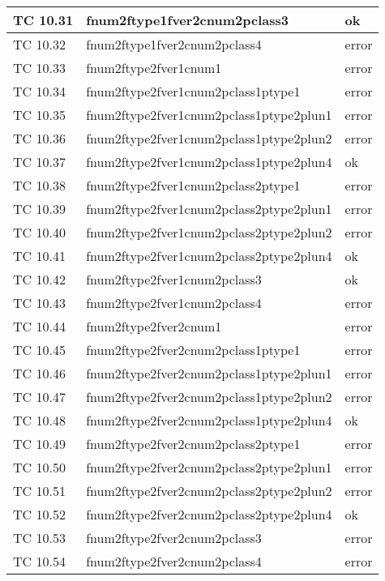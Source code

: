 \begin{longtable}{|p{3cm}|p{7cm}|p{3cm}|}
	\hline
	TC 10.31			& fnum2ftype1fver2cnum2pclass3			& ok \tabularnewline
	\hline
	TC 10.32			& fnum2ftype1fver2cnum2pclass4			& error \tabularnewline
	\hline
	TC 10.33			& fnum2ftype2fver1cnum1				& error \tabularnewline
	\hline
	TC 10.34			& fnum2ftype2fver1cnum2pclass1ptype1		& error \tabularnewline
	\hline
	TC 10.35			& fnum2ftype2fver1cnum2pclass1ptype2plun1	& error \tabularnewline
	\hline
	TC 10.36			& fnum2ftype2fver1cnum2pclass1ptype2plun2	& error \tabularnewline
	\hline
	TC 10.37			& fnum2ftype2fver1cnum2pclass1ptype2plun4	& ok \tabularnewline
	\hline
	TC 10.38			& fnum2ftype2fver1cnum2pclass2ptype1		& error \tabularnewline
	\hline
	TC 10.39			& fnum2ftype2fver1cnum2pclass2ptype2plun1	& error \tabularnewline
	\hline
	TC 10.40			& fnum2ftype2fver1cnum2pclass2ptype2plun2	& error \tabularnewline
	\hline
	TC 10.41			& fnum2ftype2fver1cnum2pclass2ptype2plun4	& ok \tabularnewline
	\hline
	TC 10.42			& fnum2ftype2fver1cnum2pclass3			& ok \tabularnewline
	\hline
	TC 10.43			& fnum2ftype2fver1cnum2pclass4			& error \tabularnewline
	\hline
	TC 10.44			& fnum2ftype2fver2cnum1				& error \tabularnewline
	\hline
	TC 10.45			& fnum2ftype2fver2cnum2pclass1ptype1		& error \tabularnewline
	\hline
	TC 10.46			& fnum2ftype2fver2cnum2pclass1ptype2plun1	& error \tabularnewline
	\hline
	TC 10.47			& fnum2ftype2fver2cnum2pclass1ptype2plun2	& error \tabularnewline
	\hline
	TC 10.48			& fnum2ftype2fver2cnum2pclass1ptype2plun4	& ok \tabularnewline
	\hline
	TC 10.49			& fnum2ftype2fver2cnum2pclass2ptype1		& error \tabularnewline
	\hline
	TC 10.50			& fnum2ftype2fver2cnum2pclass2ptype2plun1	& error \tabularnewline
	\hline
	TC 10.51			& fnum2ftype2fver2cnum2pclass2ptype2plun2	& error \tabularnewline
	\hline
	TC 10.52			& fnum2ftype2fver2cnum2pclass2ptype2plun4	& ok \tabularnewline
	\hline
	TC 10.53			& fnum2ftype2fver2cnum2pclass3			& error \tabularnewline
	\hline
	TC 10.54			& fnum2ftype2fver2cnum2pclass4			& error \tabularnewline
	\hline
\end{longtable}
